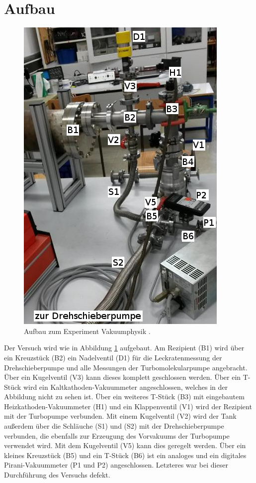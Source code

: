 
\section{Aufbau}
\label{sec:Aufbau}

\begin{figure}
\vspace{-0.5cm}
\includegraphics[scale=0.5]{content/images/Aufbau2.jpg}
\caption{Aufbau zum Experiment Vakuumphysik \cite{V70}.}
\label{fig:Aufbau}
\end{figure}

Der Versuch wird wie in Abbildung \ref{fig:Aufbau} aufgebaut. Am Rezipient (B1) wird über ein Kreuzstück (B2) ein Nadelventil (D1) für die Leckratenmessung der Drehschieberpumpe und alle Messungen der Turbomolekularpumpe angebracht. Über ein Kugelventil (V3) kann dieses komplett geschlossen werden. Über ein T-Stück wird ein Kaltkathoden-Vakuummeter angeschlossen, welches in der Abbildung nicht zu sehen ist. Über ein weiteres T-Stück (B3) mit eingebautem Heizkathoden-Vakuummeter (H1) und ein Klappenventil (V1) wird der Rezipient mit der Turbopumpe verbunden. Mit einem Kugelventil (V2) wird der Tank außerdem über die Schläuche (S1) und (S2) mit der Drehschieberpumpe verbunden, die ebenfalls zur Erzeugung des Vorvakuums der Turbopumpe verwendet wird. Mit dem Kugelventil (V5) kann dies geregelt werden. Über ein kleines Kreuzstück (B5) und ein T-Stück (B6) ist ein analoges und ein digitales Pirani-Vakuummeter (P1 und P2) angeschlossen. Letzteres war bei dieser Durchführung des Versuchs defekt.